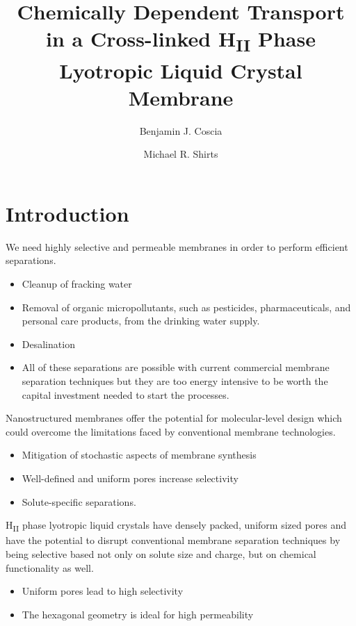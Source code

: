 \documentclass{article}
\title{Chemically Dependent Transport in a Cross-linked H\textsubscript{II} Phase Lyotropic Liquid Crystal Membrane}
\author{Benjamin J. Coscia \and Michael R. Shirts}
\begin{document}
  \graphicspath{{./figures/}}
  \maketitle

  \section{Introduction}

  We need highly selective and permeable membranes in order to perform efficient 
  separations.
  \begin{itemize}
    \item Cleanup of fracking water
    \item Removal of organic micropollutants, such as pesticides, pharmaceuticals,
    and personal care products, from the drinking water supply.
    \item Desalination
    \item All of these separations are possible with current commercial membrane
    separation techniques but they are too energy intensive to be worth the 
    capital investment needed to start the processes.
  \end{itemize}
  
  Nanostructured membranes offer the potential for molecular-level design which
  could overcome the limitations faced by conventional membrane technologies.
  \begin{itemize}
    \item Mitigation of stochastic aspects of membrane synthesis
    \item Well-defined and uniform pores increase selectivity
    \item Solute-specific separations.
  \end{itemize} 

  H\textsubscript{II} phase lyotropic liquid crystals have densely packed, uniform
  sized pores and have the potential to disrupt conventional membrane separation
  techniques by being selective based not only on solute size and charge, but on 
  chemical functionality as well.
  \begin{itemize}
    \item Uniform pores lead to high selectivity
    \item The hexagonal geometry is ideal for high permeability
  \end{itemize}
\end{document}
